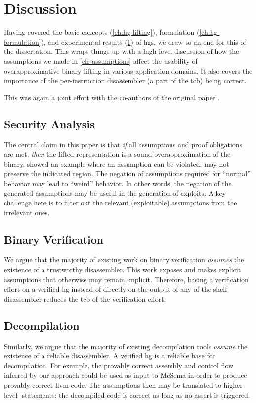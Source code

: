 \chapter{Discussion}\label{ch:hg-discussion}
Having covered the basic concepts (\cref{ch:hg-lifting}), formulation (\cref{ch:hg-formulation}), and experimental results (\cref{ch:hg-discussion}) of \acp{hg}, we draw to an end for this  of the dissertation.
This  wraps things up with a high-level discussion of how the assumptions we made in \cref{cfr-assumptions} affect the usability of overapproximative binary lifting in various application domains.
It also covers the importance of the per-instruction disassembler (a part of the \ac{tcb}) being correct.

This  was again a joint effort with the co-authors of the original paper \autocite{verbeek2022lifting}.

\section{Security Analysis}
The central claim in this paper is that \emph{if} all assumptions and proof obligations are met,
\emph{then} the lifted representation is a sound overapproximation of the binary.
 showed an example where an assumption can be violated:  may not preserve the indicated region.
The negation of assumptions required for ``normal'' behavior may lead to ``weird'' behavior.
In other words, the negation of the generated assumptions may be useful in the generation of exploits.
A key challenge here is to filter out the relevant (exploitable) assumptions from the irrelevant ones.

\section{Binary Verification}
We argue that the majority of existing work on binary verification \emph{assumes} the existence of a trustworthy disassembler.
This work exposes and makes explicit assumptions that otherwise may remain implicit.
Therefore, basing a verification effort on a verified \ac{hg} instead of directly on the output of any of-the-shelf disassembler reduces the \ac{tcb} of the verification effort.

\section{Decompilation}
Similarly, we argue that the majority of existing decompilation tools \emph{assume} the existence of a reliable disassembler.
A verified \ac{hg} is a reliable base for decompilation.
For example, the provably correct assembly and control flow inferred by our approach could be used as input to McSema \autocite{dinaburg2014mcsema} in order to produce provably correct \gls{llvm} code.
The assumptions then may be translated to higher-level -statements: the decompiled code is correct as long as no assert is triggered.

